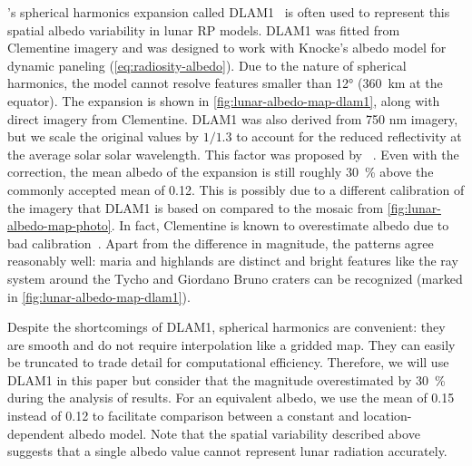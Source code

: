 \citeauthor{Floberghagen1999}'s  spherical harmonics expansion called \gls{DLAM1}~\cite{Floberghagen1999} is often used to represent this spatial albedo variability in lunar \gls{RP} models. \gls{DLAM1} was fitted from Clementine imagery and was designed to work with Knocke's albedo model for dynamic paneling (\cref{eq:radiosity-albedo}). Due to the nature of spherical harmonics, the model cannot resolve features smaller than \ang{12} (\qty{360}{\km} at the equator). The expansion is shown in \cref{fig:lunar-albedo-map-dlam1}, along with direct imagery from Clementine. \gls{DLAM1} was also derived from 750 nm imagery, but we scale the original values by $1/1.3$ to account for the reduced reflectivity at the average solar solar wavelength. This factor was proposed by \citeauthor{Vasavada2012}~\cite{Vasavada2012}. Even with the correction, the mean albedo of the expansion is still roughly \qty{30}{\percent} above the commonly accepted mean of 0.12. This is possibly due to a different calibration of the imagery that \gls{DLAM1} is based on compared to the mosaic from \cref{fig:lunar-albedo-map-photo}. In fact, Clementine is known to overestimate albedo due to bad calibration~\cite{Shkuratov2011}. Apart from the difference in magnitude, the patterns agree reasonably well: maria and highlands are distinct and bright features like the ray system around the Tycho and Giordano Bruno craters can be recognized (marked in \cref{fig:lunar-albedo-map-dlam1}).

Despite the shortcomings of \gls{DLAM1}, spherical harmonics are convenient: they are smooth and do not require interpolation like a gridded map. They can easily be truncated to trade detail for computational efficiency. Therefore, we will use \gls{DLAM1} in this paper but consider that the magnitude overestimated by \qty{30}{\percent} during the analysis of results. For an equivalent albedo, we use the mean of 0.15 instead of 0.12 to facilitate comparison between a constant and location-dependent albedo model. Note that the spatial variability described above suggests that a single albedo value cannot represent lunar radiation accurately.

